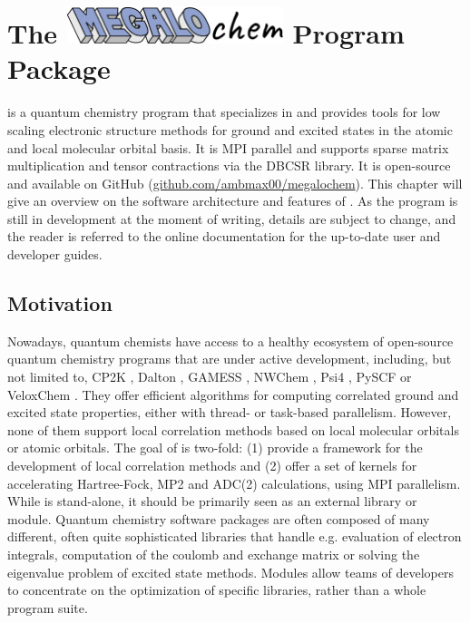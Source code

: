 \chapter[The \mchem{} Program Package]{The \protect\includegraphics[height=30pt]{Pics/MEGALOCHEM.pdf} Program Package}


\mchem{} is a quantum chemistry program that specializes in and provides tools for low scaling electronic structure methods for ground and excited states in the atomic and local molecular orbital basis. It is  MPI parallel and supports sparse matrix multiplication and tensor contractions via the DBCSR library. It is open-source and available on GitHub (\url{github.com/ambmax00/megalochem}). This chapter will give an overview on the software architecture and features of \mchem{}. As the program is still in development at the moment of writing, details are subject to change, and the reader is referred to the online documentation for the up-to-date user and developer guides.

\section{Motivation}

Nowadays, quantum chemists have access to a healthy ecosystem of open-source quantum chemistry programs that are under active development, including, but not limited to, CP2K \cite{Hut2014}, Dalton \cite{Aid2014}, GAMESS \cite{Gor2005}, NWChem \cite{Val2010}, Psi4 \cite{Tur2012}, PySCF \cite{Sun2018} or VeloxChem \cite{Rin2020}. They offer efficient algorithms for computing correlated ground and excited state properties, either with thread- or task-based parallelism. However, none of them support local correlation methods based on local molecular orbitals or atomic orbitals. The goal of \mchem{} is two-fold: (1) provide a framework for the development of local correlation methods and (2) offer a set of kernels for accelerating Hartree-Fock, MP2 and ADC(2) calculations, using MPI parallelism. While \mchem{} is stand-alone, it should be primarily seen as an external library or module. Quantum chemistry software packages are often composed of many different, often quite sophisticated libraries that handle e.g. evaluation of electron integrals, computation of the coulomb and exchange matrix or solving the eigenvalue problem of excited state methods. Modules allow teams of developers to concentrate on the optimization of specific libraries, rather than a whole program suite. %

